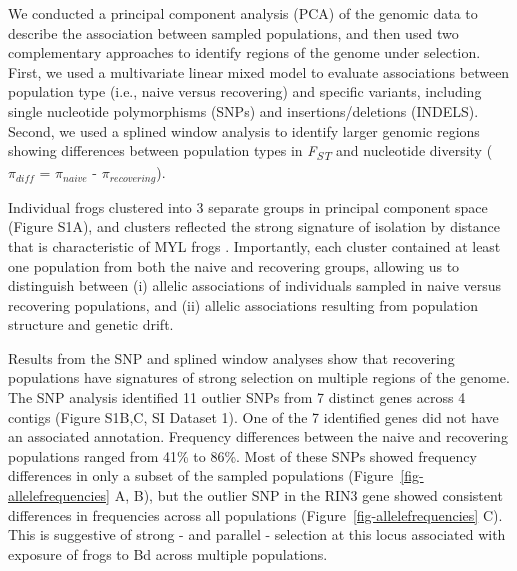 \documentclass[9pt,twocolumn,twoside,lineno]{pnas-new}
\begin{document}
We conducted a principal component analysis (PCA) of the genomic data to
describe the association between sampled populations, and then used two
complementary approaches to identify regions of the genome under
selection. First, we used a multivariate linear mixed model to evaluate
associations between population type (i.e., naive versus recovering) and
specific variants, including single nucleotide polymorphisms (SNPs) and
insertions/deletions (INDELS). Second, we used a splined window analysis
to identify larger genomic regions showing differences between
population types in \emph{F\textsubscript{ST}} and nucleotide diversity
(\(\pi_{diff}\) = \(\pi_{naive}\) - \(\pi_{recovering}\)).

Individual frogs clustered into 3 separate groups in principal component
space (Figure S1A), and clusters reflected
the strong signature of isolation by distance that is characteristic of
MYL frogs \citep{rothstein2020, poorten2017}. Importantly, each cluster
contained at least one population from both the naive and recovering
groups, allowing us to distinguish between (i) allelic associations of
individuals sampled in naive versus recovering populations, and (ii)
allelic associations resulting from population structure and genetic
drift.

Results from the SNP and splined window analyses show that recovering
populations have signatures of strong selection on multiple regions of
the genome. The SNP analysis identified 11 outlier SNPs from 7 distinct
genes across 4 contigs (Figure S1B,C, SI
Dataset 1). One of the 7 identified genes did not have an associated
annotation. Frequency differences between the naive and recovering
populations ranged from 41\% to 86\%. Most of these SNPs showed
frequency differences in only a subset of the sampled populations
(Figure~\ref{fig-allelefrequencies} A, B), but the outlier SNP in the
RIN3 gene showed consistent differences in frequencies across all
populations (Figure~\ref{fig-allelefrequencies} C). This is suggestive
of strong - and parallel - selection at this locus associated with
exposure of frogs to Bd across multiple populations.
\end{document}
